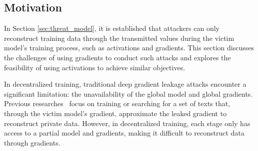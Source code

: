 \subsection{Motivation}
\label{sec:act_cos}

In Section \ref{sec:threat_model}, it is established that attackers can only reconstruct training data through the transmitted values during the victim model's training process, such as activations and gradients. This section discusses the challenges of using gradients to conduct such attacks and explores the feasibility of using activations to achieve similar objectives.


In decentralized training, traditional deep gradient leakage attacks encounter a significant limitation: the unavailability of the global model and global gradients. Previous researches~\cite {zhu2019deep, gupta2022recovering, balunovic2022lamp} focus on training or searching for a set of texts that, through the victim model’s gradient, approximate the leaked gradient to reconstruct private data. However, in decentralized training, each stage only has access to a partial model and gradients, making it difficult to reconstruct data through gradients.


